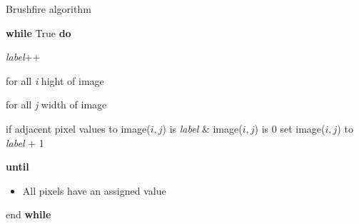 \documentclass[../Head/Main.tex]{subfiles}
\begin{document}
\begin{Pseudo}{Brushfire algorithm}{}

	\textbf{while} True \textbf{do}
	

	\begin{Indentation}
	\item \textit{label}++
	\begin{Indentation}

	\item for all \textit{i} hight of image 
	\begin{Indentation}
	\item for all \textit{j} width of image 
	\item if adjacent pixel values to image($i, j $) is \textit{label} $\&$ image($i, j$) is 0 set image($i, j $) to \textit{label} + 1	
	
	\end{Indentation}
	
	\item \textbf{until}
				
	\begin{itemize}
	\item All pixels have an assigned value 
	\end{itemize}

	\end{Indentation}
	
	 \item end \textbf{while}

	\end{Indentation}
	
\end{Pseudo}
\end{document}
